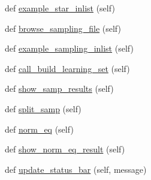 \begin{DoxyCompactItemize}
\item 
def \hyperlink{classasamba_1_1frontend_1_1_g_u_i_a30a1139534dbd25b7635bd39c649a219}{example\+\_\+star\+\_\+inlist} (self)
\item 
def \hyperlink{classasamba_1_1frontend_1_1_g_u_i_ac0b39055d224594aca6190e6c0d7fe7e}{browse\+\_\+sampling\+\_\+file} (self)
\item 
def \hyperlink{classasamba_1_1frontend_1_1_g_u_i_a1a0a42d5c06ceb02b8a48dd7ff2f686e}{example\+\_\+sampling\+\_\+inlist} (self)
\item 
def \hyperlink{classasamba_1_1frontend_1_1_g_u_i_a118685a11c1f7602c17c22bc35419ef2}{call\+\_\+build\+\_\+learning\+\_\+set} (self)
\item 
def \hyperlink{classasamba_1_1frontend_1_1_g_u_i_a2f99fe1402d07c15d79897c8ec0ee4e0}{show\+\_\+samp\+\_\+results} (self)
\item 
def \hyperlink{classasamba_1_1frontend_1_1_g_u_i_a284b5146fbb37994b46e34ce48475f65}{split\+\_\+samp} (self)
\item 
def \hyperlink{classasamba_1_1frontend_1_1_g_u_i_a0e5bd5cd537353b15645f21196606524}{norm\+\_\+eq} (self)
\item 
def \hyperlink{classasamba_1_1frontend_1_1_g_u_i_a863beb8817b0f728771fcb3323afb043}{show\+\_\+norm\+\_\+eq\+\_\+result} (self)
\item 
def \hyperlink{classasamba_1_1frontend_1_1_g_u_i_a9b882f15d916eb942b202888fa29cf12}{update\+\_\+status\+\_\+bar} (self, message)
\end{DoxyCompactItemize}
